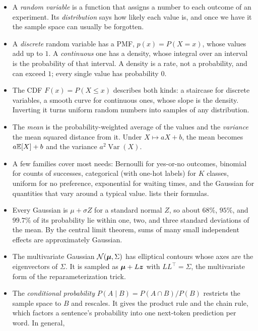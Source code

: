 \begin{itemize}
  \item A \emph{random variable} is a function that assigns a number to
    each outcome of an experiment. Its \emph{distribution} says how
    likely each value is, and once we have it the sample space can
    usually be forgotten.
  \item A \emph{discrete} random variable has a PMF, $p(x) = P(X = x)$,
    whose values add up to $1$. A \emph{continuous} one has a density,
    whose integral over an interval is the probability of that interval.
    A density is a rate, not a probability, and can exceed $1$; every
    single value has probability $0$.
  \item The CDF $F(x) = P(X \le x)$ describes both kinds: a staircase for
    discrete variables, a smooth curve for continuous ones, whose slope
    is the density. Inverting it turns uniform random numbers into
    samples of any distribution.
  \item The \emph{mean} is the probability-weighted average of the values
    and the \emph{variance} the mean squared distance from it. Under $X
    \mapsto aX + b$, the mean becomes $a\mathbb{E}[X] + b$ and the variance
    $a^2 \operatorname{Var}(X)$.
  \item A few families cover most needs: Bernoulli for yes-or-no
    outcomes, binomial for counts of successes, categorical (with one-hot
    labels) for $K$ classes, uniform for no preference, exponential for
    waiting times, and the Gaussian for quantities that vary around a
    typical value.  lists their formulas.
  \item Every Gaussian is $\mu + \sigma Z$ for a standard normal $Z$, so
    about $68\%$, $95\%$, and $99.7\%$ of its probability lie within one,
    two, and three standard deviations of the mean. By the central limit
    theorem, sums of many small independent effects are approximately
    Gaussian.
  \item The multivariate Gaussian $\mathcal{N}(\bm{\mu}, \Sigma)$ has
    elliptical contours whose axes are the eigenvectors of $\Sigma$. It
    is sampled as $\bm{\mu} + L\bm{z}$ with $LL^\top = \Sigma$, the
    multivariate form of the reparameterization trick.
  \item The \emph{conditional probability} $P(A \mid B) = P(A \cap
    B)/P(B)$ restricts the sample space to $B$ and rescales. It gives the
    product rule and the chain rule, which factors a sentence's
    probability into one next-token prediction per word. In general,

\end{itemize}
